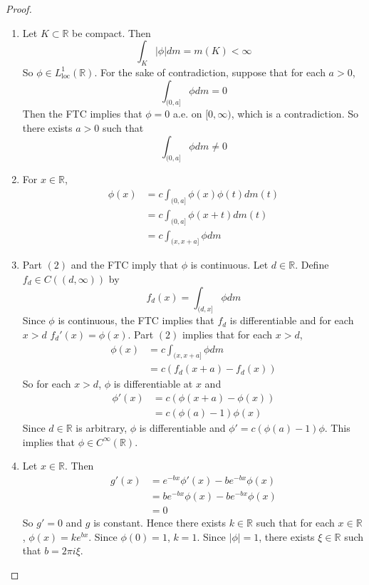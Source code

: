 \documentclass{book}
\theoremstyle{definition}
\newcommand{\R}{\mathbb{R}}
\DeclareMathOperator*{\0}{\mbf{0}}
\DeclareMathOperator*{\1}{\mbf{1}}
\newcommand{\Rg}{[0,\infty)}
\newcommand{\loc}{\text{loc}}
\begin{document}
	\begin{proof}\
		\begin{enumerate}
			\item Let $K \subset \R$ be compact. Then $$\int_K |\phi| dm = m(K) < \infty$$ So $\phi \in L^1_{\loc}(\R)$. For the sake of contradiction, suppose that for each $a >0$, $$\int_{(0,a]}\phi dm = 0$$ 
			Then the FTC implies that $\phi = 0$ a.e. on $\Rg$, which is a contradiction. So there exists $a > 0$ such that $$\int_{(0,a]}\phi dm \neq 0$$
			\item For $x \in \R$, 
			\begin{align*}
				\phi(x) 
				&= c \int_{(0,a]} \phi(x)\phi(t) dm(t) \\
				&= c \int_{(0,a]} \phi(x+t) dm(t) \\
				&= c \int_{(x,x+a]} \phi dm 
			\end{align*}
			\item Part $(2)$ and the FTC imply that $\phi$ is continuous. Let $d \in \R$. Define $f_d \in C((d, \infty))$ by $$f_d(x) = \int_{(d, x]} \phi dm$$ 
			Since $\phi$ is continuous, the FTC implies that $f_d$ is differentiable and for each $x >d$ $f_d'(x) = \phi(x)$. Part $(2)$ implies that for each $x > d$,
			\begin{align*}
				\phi(x) 
				&= c \int_{(x,x+a]} \phi dm \\
				&= c(f_d(x+a) - f_d(x))
			\end{align*}
			So for each $x > d$, $\phi$ is differentiable at $x$ and 
			\begin{align*}
				\phi'(x) 
				&= c(\phi(x+a) - \phi(x)) \\
				&= c(\phi(a) - 1) \phi(x)
			\end{align*}	 
			Since $d \in \R$ is arbitrary, $\phi$ is differentiable and $\phi' = c(\phi(a) - 1) \phi$. This implies that $\phi \in C^{\infty}(\R)$.
			\item Let $x \in \R$. Then 
			\begin{align*}
				g'(x) 
				&= e^{-bx}\phi'(x) - be^{-bx}\phi(x) \\
				&= be^{-bx} \phi(x) - be^{-bx}\phi(x) \\
				&= 0
			\end{align*}
			So $g' = 0$ and $g$ is constant. Hence there exists $k \in \R$ such that for each $x \in \R$, $\phi(x) = ke^{bx}$. Since $\phi(0) = 1$, $k = 1$. Since $|\phi| = 1$, there exists $\xi \in \R$ such that $b = 2 \pi i \xi$. 
		\end{enumerate}
	\end{proof}
	
\end{document}
